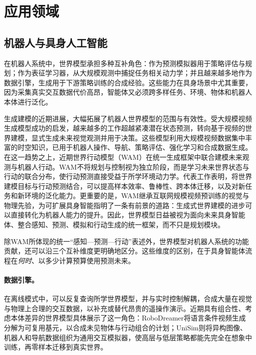 \section{应用领域}
\subsection{机器人与具身人工智能}
在机器人系统中，世界模型承担多种互补角色：作为预测模拟器用于策略评估与规划；作为表征学习器，从大规模观测中捕捉任务相关动力学；并且越来越多地作为数据引擎，生成用于下游策略训练的合成经验。这些能力在具身场景中尤其重要，因为采集真实交互数据代价高昂，智能体又必须跨多样任务、环境、物体和机器人本体进行泛化。

生成建模的近期进展，大幅拓展了机器人世界模型的范围与有效性。受大规模视频生成模型成功的启发\citep{rombach2022high}，越来越多的工作超越紧凑潜在状态预测，转向基于视频的世界建模，显式生成未来视觉观测并用于决策。这些模型利用大规模视频数据集中丰富的时空知识，已用于机器人操作、导航、策略评估、强化学习和合成数据生成。在这一趋势之上，近期世界行动模型（WAM）在统一生成框架中联合建模未来观测与机器人行动\citep{hu2024video,ye2026dreamzero}。WAM不将规划与控制视为独立阶段，而是学习未来世界状态与行动的联合分布，使行动预测直接受益于所学环境动力学。代表工作表明，将世界建模目标与行动预测结合，可以提高样本效率、鲁棒性、跨本体迁移，以及对新任务和新环境的泛化能力。更重要的是，WAM继承互联网规模视频预训练的视觉与物理先验，为可扩展具身智能指明了一条有前景的道路：生成式世界建模的进步可以直接转化为机器人能力的提升。因此，世界模型日益被视为面向未来具身智能体、整合感知、预测、模拟和行动生成的统一框架，而不只是规划模块。

除WAM所体现的统一“感知—预测—行动”表述外，世界模型对机器人系统的功能贡献，还可以沿三个互补维度更明确地区分。这些维度的区别，在于具身智能体流程在\emph{何时}、以多少计算预算使用预测未来。

\paragraph{数据引擎。}
在离线模式中，可以反复查询所学世界模型，并与实时控制解耦，合成大量在视觉与物理上合理的交互数据，以补充或替代昂贵的遥操作演示。近期具有组合性、考虑本体差异的世界模型具体展示了这一角色：RoboDreamer将语言条件视频生成分解为可复用基元，以合成未见物体与行动组合的计划\citep{zhou2024robodreamer}；UniSim则将异构图像、机器人和导航数据组织为通用交互模拟器，使高层与低层策略都能先完全在想象中训练，再零样本迁移到真实世界\citep{yang2024unisim}。

